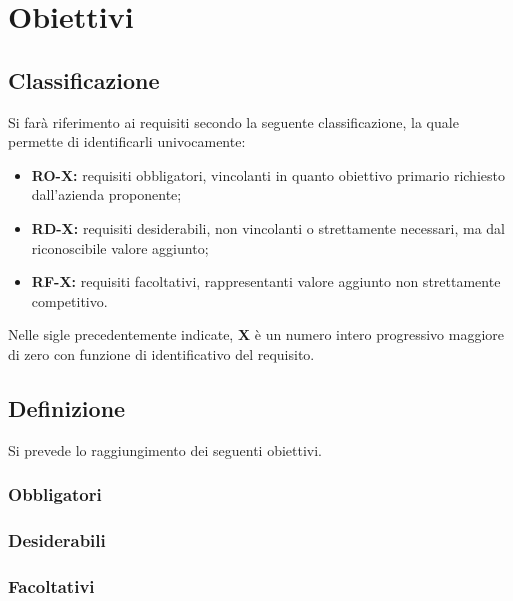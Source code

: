 
\section{Obiettivi}
	\subsection{Classificazione}
		Si farà riferimento ai requisiti secondo la seguente classificazione, la quale permette di identificarli univocamente:
		\begin{itemize}
			\item \textbf{RO-X:} requisiti obbligatori, vincolanti in quanto obiettivo primario richiesto dall'azienda proponente;
			\item \textbf{RD-X:} requisiti desiderabili, non vincolanti o strettamente necessari, ma dal riconoscibile valore aggiunto;
			\item \textbf{RF-X:} requisiti facoltativi, rappresentanti valore aggiunto non strettamente competitivo.
		\end{itemize}
		
		Nelle sigle precedentemente indicate, \textbf{X} è un numero intero progressivo maggiore di zero con funzione di identificativo del requisito.
	
	\subsection{Definizione}
		Si prevede lo raggiungimento dei seguenti obiettivi.

		\subsubsection*{Obbligatori}
		\begin{itemize}
			\obiettiviObbligatori
		\end{itemize}
		
		\subsubsection*{Desiderabili}
		\begin{itemize}
			\obiettiviDesiderabili
		\end{itemize}
		
		\subsubsection*{Facoltativi}
		\begin{itemize}
			\obiettiviFacoltativi
		\end{itemize} 
